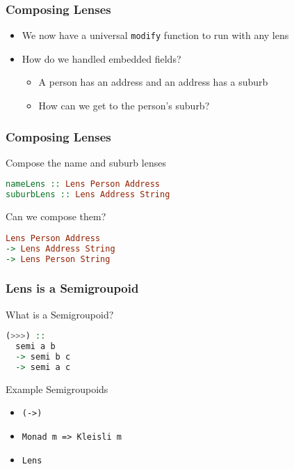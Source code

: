 \begin{frame}[fragile]
\frametitle{Composing Lenses}

\begin{itemize}
\item We now have a universal \lstinline[language=haskell]$modify$ function to run with any lens
\item How do we handled embedded fields?
  \begin{itemize}
  \item A person has an address and an address has a suburb
  \item How can we get to the person's suburb?
  \end{itemize}
\end{itemize}

\end{frame}

\begin{frame}[fragile]
\frametitle{Composing Lenses}

\begin{block}{Compose the name and suburb lenses}
\begin{lstlisting}[language=haskell]
nameLens :: Lens Person Address
suburbLens :: Lens Address String
\end{lstlisting}
\end{block}

\begin{block}{Can we compose them?}
\begin{lstlisting}[language=haskell]
Lens Person Address
-> Lens Address String
-> Lens Person String
\end{lstlisting}
\end{block}

\end{frame}

\begin{frame}[fragile]
\frametitle{Lens is a Semigroupoid}

\begin{block}{What is a Semigroupoid?}
\begin{lstlisting}[language=haskell]
(>>>) ::
  semi a b
  -> semi b c
  -> semi a c
\end{lstlisting}

\end{block}

\begin{block}{Example Semigroupoids}
\begin{itemize}
\item \lstinline$(->)$
\item \lstinline$Monad m => Kleisli m$
\item \lstinline$Lens$
\end{itemize}
\end{block}

\end{frame}

